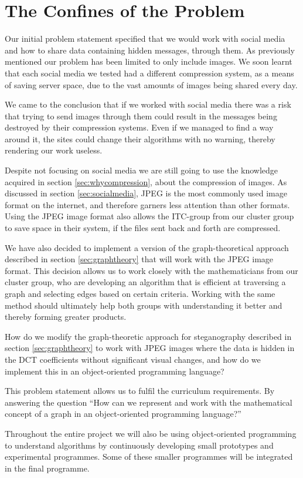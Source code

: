 \section{The Confines of the Problem}
\label{sec:confines}
Our initial problem statement specified that we would work with social media and how to share data containing hidden messages, through them.
As previously mentioned our problem has been limited to only include images.
We soon learnt that each social media we tested had a different compression system, as a means of saving server space, due to the vast amounts of images being shared every day.

We came to the conclusion that if we worked with social media there was a risk that trying to send images through them could result in the messages being destroyed by their compression systems.
Even if we managed to find a way around it, the sites could change their algorithms with no warning, thereby rendering our work useless.

Despite not focusing on social media we are still going to use the knowledge acquired in section \ref{sec:whycompression}, about the compression of images.
As discussed in section \ref{sec:socialmedia}, JPEG is the most commonly used image format on the internet, and therefore garners less attention than other formats.
Using the JPEG image format also allows the ITC-group from our cluster group to save space in their system, if the files sent back and forth are compressed.

We have also decided to implement a version of the graph-theoretical approach described in section \ref{sec:graphtheory} that will work with the JPEG image format.
This decision allows us to work closely with the mathematicians from our cluster group, who are developing an algorithm that is efficient at traversing a graph and selecting edges based on certain criteria.
Working with the same method should ultimately help both groups with understanding it better and thereby forming greater products.

\vspace{5mm}
\begin{centering}
	\begin{tcolorbox}[center title, title=Problem Statement, width=.8\textwidth]
How do we modify the graph-theoretic approach for steganography described in section \ref{sec:graphtheory} to work with JPEG images where the data is hidden in the DCT coefficients without significant visual changes, and how do we implement this in an object-oriented programming language?
	\end{tcolorbox}
\end{centering}

This problem statement allows us to fulfil the curriculum requirements.
By answering the question
``How can we represent and work with the mathematical concept of a graph in an object-oriented programming language?''


Throughout the entire project we will also be using object-oriented programming to understand algorithms by continuously developing small prototypes and experimental programmes.
Some of these smaller programmes will be integrated in the final programme.
